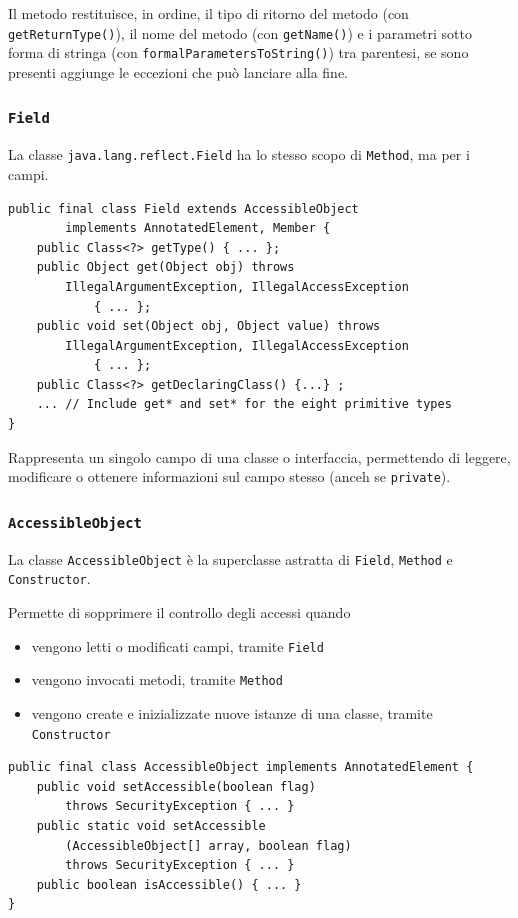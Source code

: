 Il metodo restituisce, in ordine, il tipo di ritorno del metodo (con \texttt{getReturnType()}), il nome del metodo (con \texttt{getName()}) e i parametri sotto forma di stringa (con \texttt{formalParametersToString()}) tra parentesi, se sono presenti aggiunge le eccezioni che può lanciare alla fine.

\subsubsection{\texttt{Field}}

La classe  \texttt{java.lang.reflect.Field} ha lo stesso scopo di \texttt{Method}, ma per i campi.
\begin{verbatim}
public final class Field extends AccessibleObject
        implements AnnotatedElement, Member {
    public Class<?> getType() { ... };
    public Object get(Object obj) throws
        IllegalArgumentException, IllegalAccessException
            { ... };
    public void set(Object obj, Object value) throws
        IllegalArgumentException, IllegalAccessException
            { ... };
    public Class<?> getDeclaringClass() {...} ;
    ... // Include get* and set* for the eight primitive types
}
\end{verbatim}

Rappresenta un singolo campo di una classe o interfaccia, permettendo di leggere, modificare o ottenere informazioni sul campo stesso (anceh se \texttt{private}).

\subsubsection{\texttt{AccessibleObject}}
La classe \texttt{AccessibleObject} è la superclasse astratta di \texttt{Field}, \texttt{Method} e \texttt{Constructor}.

Permette di sopprimere il controllo degli accessi quando
\begin{itemize}
    \item vengono letti o modificati campi, tramite \texttt{Field}

    \item vengono invocati metodi, tramite \texttt{Method}

    \item vengono create e inizializzate nuove istanze di una classe, tramite \texttt{Constructor}
\end{itemize}
\begin{verbatim}
public final class AccessibleObject implements AnnotatedElement {
    public void setAccessible(boolean flag)
        throws SecurityException { ... }
    public static void setAccessible
        (AccessibleObject[] array, boolean flag)
        throws SecurityException { ... }
    public boolean isAccessible() { ... }
}
\end{verbatim}

